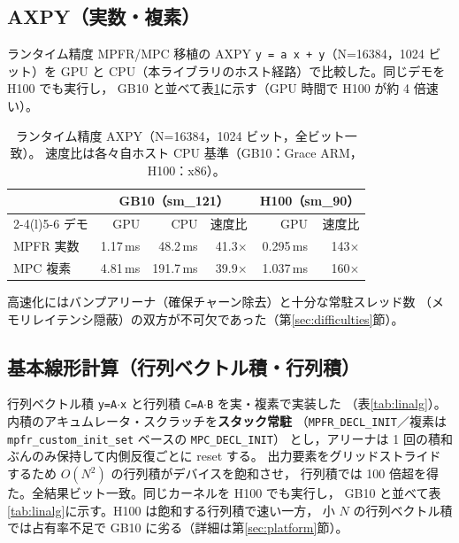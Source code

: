 \documentclass[uplatex,dvipdfmx,a4paper,11pt]{jsarticle}
\newcommand{\code}[1]{\texttt{#1}}
\begin{document}
\subsection{AXPY（実数・複素）}

ランタイム精度 MPFR/MPC 移植の AXPY \code{y = a\,x + y}（N=16384，1024 ビット）を
GPU と CPU（本ライブラリのホスト経路）で比較した。同じデモを H100 でも実行し，
GB10 と並べて表\ref{tab:axpy}に示す（GPU 時間で H100 が約 4 倍速い）。

\begin{table}[h]
\centering
\caption{ランタイム精度 AXPY（N=16384，1024 ビット，全ビット一致）。
速度比は各々自ホスト CPU 基準（GB10：Grace ARM，H100：x86）。}
\label{tab:axpy}
\begin{tabular}{lrrr@{\hskip 2em}rr}
\toprule
 & \multicolumn{3}{c}{GB10（sm\_121）} & \multicolumn{2}{c}{H100（sm\_90）}\\
\cmidrule(r){2-4}\cmidrule(l){5-6}
デモ & GPU & CPU & 速度比 & GPU & 速度比 \\
\midrule
MPFR 実数 & 1.17\,ms & 48.2\,ms  & 41.3$\times$ & 0.295\,ms & 143$\times$ \\
MPC  複素 & 4.81\,ms & 191.7\,ms & 39.9$\times$ & 1.037\,ms & 160$\times$ \\
\bottomrule
\end{tabular}
\end{table}

高速化にはバンプアリーナ（確保チャーン除去）と十分な常駐スレッド数
（メモリレイテンシ隠蔽）の双方が不可欠であった（第\ref{sec:difficulties}節）。

\subsection{基本線形計算（行列ベクトル積・行列積）}

行列ベクトル積 \code{y=A\(\cdot\)x} と行列積 \code{C=A\(\cdot\)B} を実・複素で実装した
（表\ref{tab:linalg}）。内積のアキュムレータ・スクラッチを\textbf{スタック常駐}
（\code{MPFR\_DECL\_INIT}／複素は \code{mpfr\_custom\_init\_set} ベースの \code{MPC\_DECL\_INIT}）
とし，アリーナは 1 回の積和ぶんのみ保持して内側反復ごとに reset する。
出力要素をグリッドストライドするため $O(N^2)$ の行列積がデバイスを飽和させ，
行列積では 100 倍超を得た。全結果ビット一致。同じカーネルを H100 でも実行し，
GB10 と並べて表\ref{tab:linalg}に示す。H100 は飽和する行列積で速い一方，
小 $N$ の行列ベクトル積では占有率不足で GB10 に劣る（詳細は第\ref{sec:platform}節）。
\end{document}
